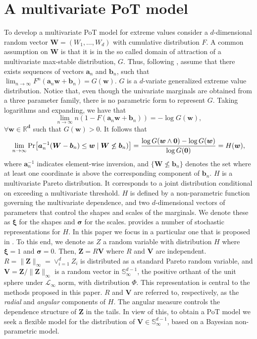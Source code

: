 \section{A multivariate PoT model\label{sec:multivariatepot}}
To develop a multivariate PoT model for extreme values consider a 
    $d$-dimensional random vector $\bm{W} = (W_1, \ldots ,W_d)$ with
    cumulative distribution $F$. A common assumption on 
    $\bm{W}$ is that it is in the so called domain of attraction of 
    a multivariate max-stable distribution, $G$. Thus, following \cite{RoSeWa2018a}, assume 
    that there exists sequences of vectors $\bm{a}_n$ and $\bm{b}_n$,
    such that $\lim_{n\rightarrow\infty} F^n(\bm{a}_n \bm{w} + \bm{b}_n) = 
    G(\bm{w})$. $G$ is a $d$-variate generalized extreme value 
    distribution. Notice that, even though the univariate marginals are obtained from 
    a three parameter family, there is no parametric form to represent $G$.
    Taking logarithms and expanding, we have that 
    \[  
        \lim\limits_{n\rightarrow\infty} n(1 - F(\bm{a}_n \bm{w} + \bm{b}_n)) = 
        -\log G(\bm{w}), 
    \]
    $\forall \bm{w\in{\mathbb R}^d}$ such that $G(\bm{w})>0$. It follows that
    \begin{multline*}
        \lim\limits_{n\rightarrow\infty} \prob{\bm{a}^{-1}_n (\bm{W} - \bm{b}_n) 
      \leq \bm{w} \mid \bm{W} \not\leq \bm{b}_n)} = 
         \frac{\log G(\bm{w} \wedge \bm{0}) 
        - \log G(\bm{w}) }{\log G(\bm{0})} = H(\bm{w}),
    \end{multline*}
    where $\bm{a}_n^{-1}$ indicates element-wise inversion, and 
    $\{\bm{W} \not\leq \bm{b}_n\}$ denotes the set where at least one coordinate is above 
    the corresponding  component of $\bm{b}_n$.  
    $H$ is a multivariate Pareto distribution.  It corresponds to a joint
    distribution conditional on exceeding a multivariate threshold. $H$
    is defined by a non-parametric function governing the multivariate dependence, and 
    two $d$-dimensional vectors of 
    parameters that control the shapes and scales of the
    marginals. We denote these as $\bm{\xi}$ for the shapes and $\bm{\sigma}$ 
    for the scales.  \cite{RoSeWa2018a} provides a number of stochastic 
    representations for $H$.  In this paper we focus in a
    particular one that is proposed in \cite{ferreira2014}. To this end, 
    we denote as $Z$ a random variable with distribution $H$ where $\bm{\xi}= 1$ 
    and $\bm{\sigma} = 0$.  Then, $\bm{Z} = R\bm{V}$ where $R$ and $\bm{V}$ 
    are independent. $R = \|\bm{Z}\|_\infty= \vee_{i=1}^d Z_i$ is
    distributed as a standard Pareto random variable, and 
    $\bm{V} = \bm{Z}/\|\bm{Z}\|_\infty$ is a random vector in  
    $\mathbb{S}_{\infty}^{d-1}$, the positive orthant of the 
    unit sphere under $\mathcal{L}_{\infty}$ norm, with distribution $\Phi$. 
    This representation is central to the methods proposed in this paper.
    $R$ and $\bm{V}$ are referred to, respectively, as the {\em radial} 
    and {\em angular} components of $H$. The angular measure controls 
    the dependence  structure of $\bm{Z}$  in the tails. In view of 
    this, to obtain a  PoT model we seek a flexible model for the 
    distribution of $\bm{V} \in {\mathbb S}_{\infty}^{d-1}$, based
    on a Bayesian non-parametric model.


